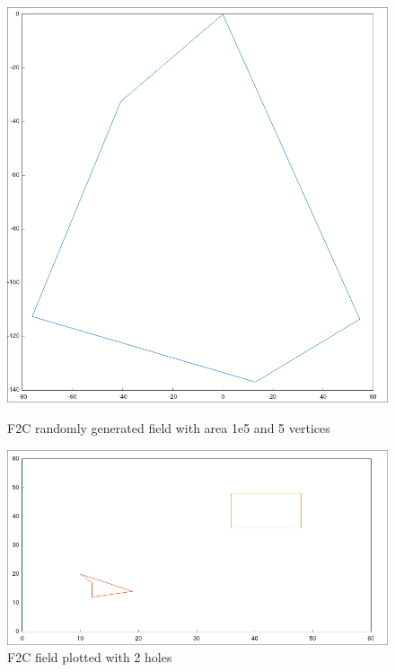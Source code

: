 \documentclass[progress]{cmpreport}
\begin{document}
\begin{appendix}
	\begin{figure}[H]
		\centering
		\begin{minipage}[b]{0.75\textwidth}
			\centering
			\includegraphics[width=\textwidth]{images/f2cMappingRandom.jpg}
			\caption{F2C randomly generated field with area 1e5 and 5 vertices}
		\end{minipage}

		\hfill
		\vspace{1em}

		\begin{minipage}[b]{0.75\textwidth}
			\centering
			\includegraphics[width=\textwidth]{images/f2cMappingHoles.jpg}
			\caption{F2C field plotted with 2 holes}
		\end{minipage}


\end{figure}
\end{appendix}
\end{document}
